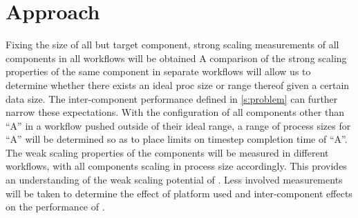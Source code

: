 \section{Approach}
\label{s:approach}
\begin{outline}
  \1 Fixing the size of all but target component, strong scaling measurements of all components in all workflows will be obtained
    \2  A comparison of the strong scaling properties of the same component 
    in separate workflows will allow us to determine whether there exists an ideal proc size or range thereof 
    given a certain data size.
    \2 The inter-component performance defined in \ref{s:problem} can further narrow these expectations.
  \1 With the configuration of all components other than ``A'' in a workflow pushed outside of their ideal range, a range of process sizes for ``A'' will be determined so as to place limits on timestep completion time of ``A''.
  \1 The weak scaling properties of the components will be measured in different workflows, with all components scaling in process size accordingly. This provides an understanding of the weak scaling potential of \sys.
  \1 Less involved measurements will be taken to determine the effect of platform used and inter-component effects on the performance of \sys.
\end{outline}
